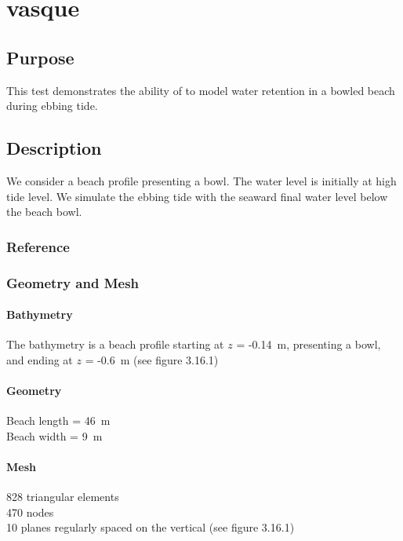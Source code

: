 \chapter{vasque}
%
%
\section{Purpose}
%
This test demonstrates the ability of  to model water
retention in a bowled beach during ebbing tide.
%
\section{Description}
%
We consider a beach profile presenting a bowl.
The water level is initially at high tide level.
We simulate the ebbing tide with the seaward final water level below
the beach bowl.
%
%
%
%
\subsection{Reference}
%

%
%
%
\subsection{Geometry and Mesh}
%
\subsubsection{Bathymetry}
%
The bathymetry is a beach profile starting at $z$ = -0.14~m, presenting
a bowl, and ending at $z$ = -0.6~m (see figure 3.16.1)
%
\subsubsection{Geometry}
%
Beach length = 46~m\\
Beach width = 9~m
%
\subsubsection{Mesh}
%
828 triangular elements\\
470 nodes\\
10 planes regularly spaced on the vertical (see figure 3.16.1)
%
%
%
